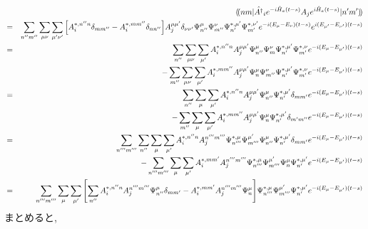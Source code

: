 \documentclass[10.5pt,a4paper]{jreport}
\newcommand{\dpbra}[1]{( \! ( #1 |}
\newcommand{\dpket}[1]{| #1 ) \! )}
\begin{document}
\begin{eqnarray}
\nonumber  &&\dpbra{nm}\hat{A^\dagger}_ie^{-i\hat{H}_a(t-s)}A_j e^{i\hat{H}_a(t-s)}\dpket{n'm'}\\
  \nonumber &=& \sum_{n''m''}\sum_{\mu\nu}\sum_{\mu'\nu'}\bqty{A_i^{*, n''n}\delta_{mm''} - A_i^{*, mm''}\delta_{nn''}}A_j^{ {\mu\mu'}}\delta_{ {\nu\nu'}}\Psi_{n''}^{\mu}\Psi_{m''}^{\nu}\Psi_{n'}^{*, \mu'}\Psi_{m'}^{*, \nu'}e^{-i(E_\mu - E_\nu)(t-s)}e^{i(E_{\mu'} - E_{\nu'})(t-s)}\\
  \nonumber &=&\sum_{n''}\sum_{\mu\nu}\sum_{ {\mu'}}A_i^{*, n''n}A_j^{\mu\mu'}\Psi_{n''}^{\mu}\Psi_{m}^{\nu}\Psi_{n'}^{*, \mu'}\Psi_{m'}^{*, \nu}e^{ {-i(E_\mu- E_{\mu'})(t-s)}}\\
  &&- \sum_{m''}\sum_{\mu\nu}\sum_{ {\mu'}}A_i^{*, mm''}A_j^{\mu\mu'}\Psi_{n}^{\mu}\Psi_{m''}^{\nu}\Psi_{n'}^{*, \mu'}\Psi_{m'}^{*, \nu}e^{ {-i(E_\mu- E_{\mu'})(t-s)}}\\
  \nonumber &=&\sum_{n''}\sum_{ {\mu}}\sum_{ {\mu'}}A_i^{ {*, n''n}}A_j^{\mu\mu'}\Psi_{n''}^{\mu}\Psi_{n'}^{*, \mu'}\delta_{mm'}e^{ {-i(E_\mu- E_{\mu'})(t-s)}}\\
  &&- \sum_{m''}\sum_{ {\mu}}\sum_{ {\mu'}}A_i^{*, mm''}A_j^{\mu\mu'}\Psi_{n}^{\mu}\Psi_{n'}^{*, \mu'}\delta_{m'm''}e^{ {-i(E_\mu- E_{\mu'})(t-s)}}\\
  \nonumber &=&\sum_{n'''m'''}\sum_{n''}\sum_{ {\mu}}\sum_{ {\mu'}}A_i^{ {*, n''n}}A_j^{n'''m'''}\Psi_{n'''}^{*, \mu}\Psi_{m'''}^{\mu'}\Psi_{n''}^{\mu}\Psi_{n'}^{*, \mu'}\delta_{mm'}e^{ {-i(E_\mu- E_{\mu'})(t-s)}}\\
  &&- \sum_{n'''m'''}\sum_{ {\mu}}\sum_{ {\mu'}}A_i^{*, mm'}A_j^{n'''m'''}\Psi_{n'''}^{*, \mu}\Psi_{m'''}^{\mu'}\Psi_{n}^{\mu}\Psi_{n'}^{*, \mu'}e^{ {-i(E_\mu- E_{\mu'})(t-s)}}\\
    \nonumber &=&\sum_{n'''m'''}\sum_{ {\mu}}\sum_{ {\mu'}}\bqty{\sum_{n''}A_i^{ {*, n''n}}A_j^{n'''m'''}\Psi_{n''}^{\mu}\delta_{mm'} - A_i^{*, mm'}A_j^{n'''m'''}\Psi_{n}^{\mu}}\Psi_{n'''}^{*, \mu}\Psi_{m'''}^{\mu'}\Psi_{n'}^{*, \mu'}e^{ {-i(E_\mu- E_{\mu'})(t-s)}}\\
\end{eqnarray}
まとめると,
\end{document}
